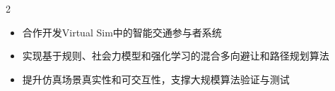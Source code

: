 \documentclass[10pt,a4paper,ragged2e,withhyper]{altacv}
\begin{document}
\begin{paracol}{2}
\begin{itemize}
\item 合作开发Virtual Sim中的智能交通参与者系统
\item 实现基于规则、社会力模型和强化学习的混合多向避让和路径规划算法
\item 提升仿真场景真实性和可交互性，支撑大规模算法验证与测试
\end{itemize}













\end{paracol}
\end{document}

